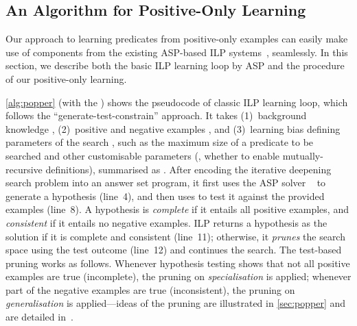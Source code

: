 \subsection{An Algorithm for Positive-Only Learning}
\label{sec:popper2}
%


Our approach to learning predicates from positive-only examples can easily make use of components from the existing ASP-based ILP systems~\cite{cropper2021learning,cropper2022learning2}, seamlessly. In this section, we describe both the basic ILP learning loop by ASP and the procedure of our positive-only learning.

\autoref{alg:popper} (with the ) shows the
pseudocode of classic ILP learning loop, which follows the
``generate-test-constrain'' approach. It takes (1)~background
knowledge , (2)~positive and negative examples ,
and (3)~learning bias defining parameters of the search
, such as the maximum size of a predicate to be
searched and other customisable parameters (\eg, whether to enable
mutually-recursive definitions), summarised as .
%
After encoding the iterative deepening search problem into an answer
set program, it first uses the ASP solver
\clingo~\cite{gebser2014clingo} to generate a hypothesis (line~4), and
then uses \prolog to test it against the provided examples (line~8).
%
A hypothesis is \emph{complete} if it entails all positive examples,
and \emph{consistent} if it entails no negative examples.
%
ILP returns a hypothesis as the solution if it is complete and
consistent (line~11); otherwise, it \emph{prunes} the search space
using the test outcome (line~12) and continues the search.
%
%
The test-based pruning works as follows.
%
Whenever hypothesis testing shows that not all positive examples are
true (incomplete), the pruning on \emph{specialisation} is applied;
whenever part of the negative examples are true (inconsistent), the pruning
on \emph{generalisation} is applied---ideas of the pruning are illustrated in
\autoref{sec:popper} and are detailed in~\cite{cropper2021learning}.
%



